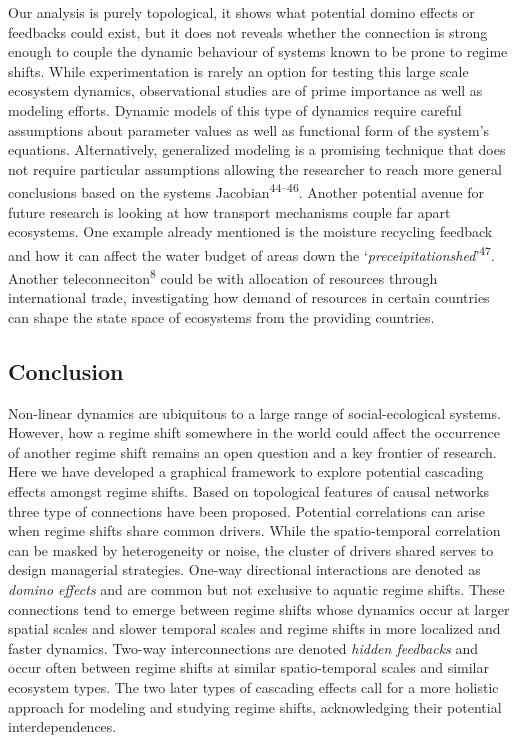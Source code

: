 \documentclass[9pt,]{article}
\begin{document}
Our analysis is purely topological, it shows what potential domino
effects or feedbacks could exist, but it does not reveals whether the
connection is strong enough to couple the dynamic behaviour of systems
known to be prone to regime shifts. While experimentation is rarely an
option for testing this large scale ecosystem dynamics, observational
studies are of prime importance as well as modeling efforts. Dynamic
models of this type of dynamics require careful assumptions about
parameter values as well as functional form of the system's equations.
Alternatively, generalized modeling is a promising technique that does
not require particular assumptions allowing the researcher to reach more
general conclusions based on the systems
Jacobian\textsuperscript{44--46}. Another potential avenue for future
research is looking at how transport mechanisms couple far apart
ecosystems. One example already mentioned is the moisture recycling
feedback and how it can affect the water budget of areas down the
`\emph{preceipitationshed}'\textsuperscript{47}. Another
teleconneciton\textsuperscript{8} could be with allocation of resources
through international trade, investigating how demand of resources in
certain countries can shape the state space of ecosystems from the
providing countries.

\subsection{Conclusion}\label{conclusion}

Non-linear dynamics are ubiquitous to a large range of social-ecological
systems. However, how a regime shift somewhere in the world could affect
the occurrence of another regime shift remains an open question and a
key frontier of research. Here we have developed a graphical framework
to explore potential cascading effects amongst regime shifts. Based on
topological features of causal networks three type of connections have
been proposed. Potential correlations can arise when regime shifts share
common drivers. While the spatio-temporal correlation can be masked by
heterogeneity or noise, the cluster of drivers shared serves to design
managerial strategies. One-way directional interactions are denoted as
\emph{domino effects} and are common but not exclusive to aquatic regime
shifts. These connections tend to emerge between regime shifts whose
dynamics occur at larger spatial scales and slower temporal scales and
regime shifts in more localized and faster dynamics. Two-way
interconnections are denoted \emph{hidden feedbacks} and occur often
between regime shifts at similar spatio-temporal scales and similar
ecosystem types. The two later types of cascading effects call for a
more holistic approach for modeling and studying regime shifts,
acknowledging their potential interdependences.
\end{document}
